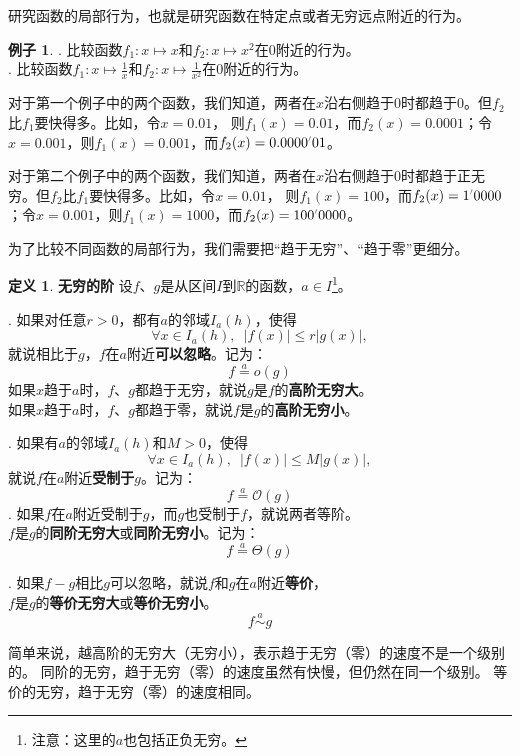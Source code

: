 \documentclass[12pt,UTF8]{ctexbook}
\newcommand{\dlim}[1]{^{\color{gray}\prime}#1}
\newcommand{\oveq}[1]{\overset{#1}{=}}
\newcommand{\olim}[1]{\mathit{o}\left(#1\right)}  %
\newcommand{\Olim}[1]{\mathcal{O}\left(#1\right)}  %
\newcommand{\Tlim}[1]{\mathcal{\Theta}\left(#1\right)}  %
\newcommand{\eqlim}[1]{\overset{#1}{\sim}}  %
\theoremstyle{definition}
\newtheorem{df}{定义}[section]
\newtheorem{ex}{例子}[section]
\theoremstyle{plain}
\begin{document}
研究函数的局部行为，也就是研究函数在特定点或者无穷远点附近的行为。

\begin{ex}
    . 比较函数$f_1: x\mapsto x$和$f_2: x\mapsto x^2$在$0$附近的行为。\\
    . 比较函数$f_1: x\mapsto \frac{1}{x}$和$f_2: x\mapsto \frac{1}{x^2}$在$0$附近的行为。
\end{ex}

对于第一个例子中的两个函数，我们知道，两者在$x$沿右侧趋于$0$时都趋于$0$。但$f_2$比$f_1$要快得多。比如，令$x=0.01$，
则$f_1(x) = 0.01$，而$f_2(x) = 0.0001$；令$x=0.001$，则$f_1(x) = 0.001$，而$f_2(x) = 0.0000\dlim{01}$。

对于第二个例子中的两个函数，我们知道，两者在$x$沿右侧趋于$0$时都趋于正无穷。但$f_2$比$f_1$要快得多。比如，令$x=0.01$，
则$f_1(x) = 100$，而$f_2(x) = 1\dlim{0000}$；令$x=0.001$，则$f_1(x) = 1000$，而$f_2(x) = 100\dlim{0000}$。

为了比较不同函数的局部行为，我们需要把“趋于无穷”、“趋于零”更细分。

\begin{df}{\textbf{无穷的阶}}
    设$f$、$g$是从区间$I$到$\mathbb{R}$的函数，$a\in I$\footnote{注意：这里的$a$也包括正负无穷。}。

    . 如果对任意$r>0$，都有$a$的邻域$I_a(h)$，使得
    $$ \forall x \in I_a(h), \,\,\, |f(x)| \leqslant r |g(x)|,$$
    \indent 就说相比于$g$，$f$在$a$附近\textbf{可以忽略}。记为：
    $$ f \oveq{a} \olim{g}$$
    \indent 如果$x$趋于$a$时，$f$、$g$都趋于无穷，就说$g$是$f$的\textbf{高阶无穷大}。\\
    \indent 如果$x$趋于$a$时，$f$、$g$都趋于零，就说$f$是$g$的\textbf{高阶无穷小}。

    . 如果有$a$的邻域$I_a(h)$和$M > 0$，使得
    $$ \forall x \in I_a(h), \,\,\, |f(x)| \leqslant M |g(x)|,$$
    \indent 就说$f$在$a$附近\textbf{受制于}$g$。记为：
    $$ f \oveq{a} \Olim{g}$$
    . 如果$f$在$a$附近受制于$g$，而$g$也受制于$f$，就说两者等阶。\\
    \indent $f$是$g$的\textbf{同阶无穷大}或\textbf{同阶无穷小}。记为：
    $$ f \oveq{a} \Tlim{g}$$

    . 如果$f - g$相比$g$可以忽略，就说$f$和$g$在$a$附近\textbf{等价}，\\
    \indent $f$是$g$的\textbf{等价无穷大}或\textbf{等价无穷小}。
    $$ f \eqlim{a} g$$

\end{df}

简单来说，越高阶的无穷大（无穷小），表示趋于无穷（零）的速度不是一个级别的。
同阶的无穷，趋于无穷（零）的速度虽然有快慢，但仍然在同一个级别。
等价的无穷，趋于无穷（零）的速度相同。
\end{document}
